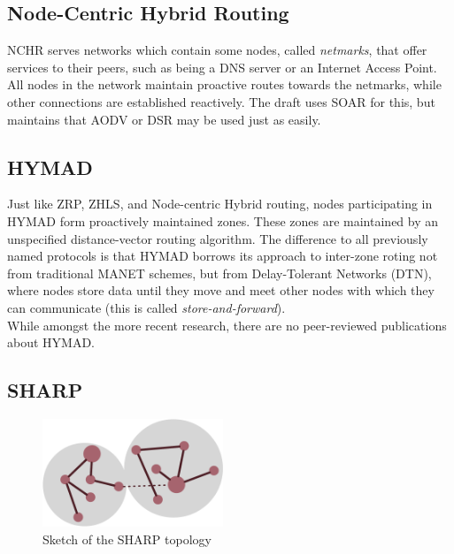 \documentclass[a4paper,10pt]{scrartcl}
\begin{document}
\subsection{Node-Centric Hybrid Routing}
\label{subsec:nchr}
NCHR\cite{Roy_nodecentric} serves networks which contain some nodes, called \emph{netmarks}, that offer services to their peers, such as being a DNS server or an Internet Access Point. All nodes in the network maintain proactive routes towards the netmarks, while other connections are established reactively. The draft uses SOAR\cite{SOAR} for this, but maintains that AODV\cite{RFC-3561} or DSR\cite{DSR} may be used just as easily.

\subsection{\gls{HYMAD}}
\label{subsec:hymad}
Just like ZRP, ZHLS, and Node-centric Hybrid routing, nodes participating in HYMAD \cite{HYMAD} form proactively maintained zones. These zones are maintained by an unspecified distance-vector routing algorithm.
The difference to all previously named protocols is that HYMAD borrows its approach to inter-zone roting not from traditional \gls{MANET} schemes, but from Delay-Tolerant Networks (DTN), where nodes store data until they move and meet other nodes with which they can communicate (this is called \emph{store-and-forward}).\\
While amongst the more recent research, there are no peer-reviewed publications about HYMAD.



\subsection{\gls{SHARP}}
\label{subsec:sharp}
\begin{figure}
  \begin{center}
    \includegraphics[width=0.48\textwidth]{../images/SHARP}
  \end{center}
  \label{fig:area_centered}
  \caption{Sketch of the SHARP topology}
\end{figure}
\end{document}
